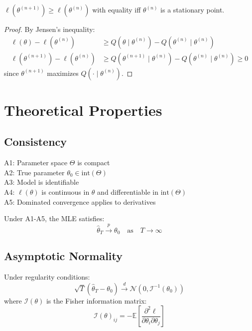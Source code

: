 \documentclass[answers,12pt,addpoints]{exam}
\begin{document}
\begin{theorem}[Monotonicity of EM]
$\ell(\theta^{(n+1)}) \geq \ell(\theta^{(n)})$ with equality iff $\theta^{(n)}$ is a stationary point.
\end{theorem}
\begin{proof}
By Jensen's inequality:
\begin{align}
    \ell(\theta) - \ell(\theta^{(n)}) &\geq Q(\theta \mid \theta^{(n)}) - Q(\theta^{(n)} \mid \theta^{(n)}) \\
    \ell(\theta^{(n+1)}) - \ell(\theta^{(n)}) &\geq Q(\theta^{(n+1)} \mid \theta^{(n)}) - Q(\theta^{(n)} \mid \theta^{(n)}) \geq 0
\end{align}
since $\theta^{(n+1)}$ maximizes $Q(\cdot \mid \theta^{(n)})$.
\end{proof}

\section{Theoretical Properties}

\subsection{Consistency}
\begin{assumption}
A1: Parameter space $\Theta$ is compact \\
A2: True parameter $\theta_0 \in \text{int}(\Theta)$ \\
A3: Model is identifiable \\
A4: $\ell(\theta)$ is continuous in $\theta$ and differentiable in $\text{int}(\Theta)$ \\
A5: Dominated convergence applies to derivatives
\end{assumption}

\begin{theorem}[Consistency]
Under A1-A5, the MLE satisfies:
\begin{equation}
    \hat{\theta}_T \xrightarrow{p} \theta_0 \quad \text{as} \quad T \to \infty
\end{equation}
\end{theorem}

\subsection{Asymptotic Normality}
\begin{theorem}
Under regularity conditions:
\begin{equation}
    \sqrt{T} (\hat{\theta}_T - \theta_0) \xrightarrow{d} \mathcal{N}(0, \mathscr{I}^{-1}(\theta_0))
\end{equation}
where $\mathscr{I}(\theta)$ is the Fisher information matrix:
\begin{equation}
    \mathscr{I}(\theta)_{ij} = -\mathbb{E}\left[ \frac{\partial^2 \ell}{\partial \theta_i \partial \theta_j} \right]
\end{equation}
\end{theorem}
\end{document}
